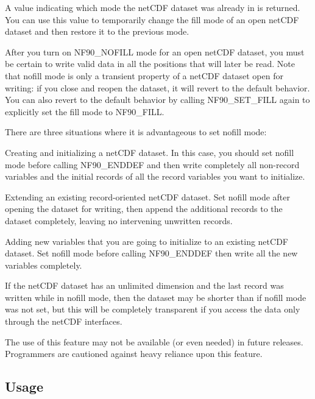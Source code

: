 A value indicating which mode the net\+C\+DF dataset was already in is returned. You can use this value to temporarily change the fill mode of an open net\+C\+DF dataset and then restore it to the previous mode.

After you turn on N\+F90\+\_\+\+N\+O\+F\+I\+LL mode for an open net\+C\+DF dataset, you must be certain to write valid data in all the positions that will later be read. Note that nofill mode is only a transient property of a net\+C\+DF dataset open for writing\+: if you close and reopen the dataset, it will revert to the default behavior. You can also revert to the default behavior by calling N\+F90\+\_\+\+S\+E\+T\+\_\+\+F\+I\+LL again to explicitly set the fill mode to N\+F90\+\_\+\+F\+I\+LL.

There are three situations where it is advantageous to set nofill mode\+:


\begin{DoxyEnumerate}
\item Creating and initializing a net\+C\+DF dataset. In this case, you should set nofill mode before calling N\+F90\+\_\+\+E\+N\+D\+D\+EF and then write completely all non-\/record variables and the initial records of all the record variables you want to initialize.
\item Extending an existing record-\/oriented net\+C\+DF dataset. Set nofill mode after opening the dataset for writing, then append the additional records to the dataset completely, leaving no intervening unwritten records.
\item Adding new variables that you are going to initialize to an existing net\+C\+DF dataset. Set nofill mode before calling N\+F90\+\_\+\+E\+N\+D\+D\+EF then write all the new variables completely.
\end{DoxyEnumerate}

If the net\+C\+DF dataset has an unlimited dimension and the last record was written while in nofill mode, then the dataset may be shorter than if nofill mode was not set, but this will be completely transparent if you access the data only through the net\+C\+DF interfaces.

The use of this feature may not be available (or even needed) in future releases. Programmers are cautioned against heavy reliance upon this feature.

\subsection*{Usage}


